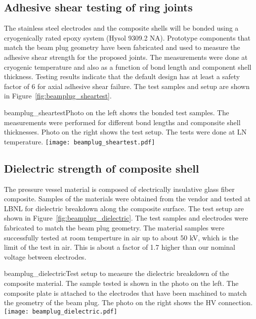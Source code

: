 \subsection{Adhesive shear testing of ring joints}
The stainless steel electrodes and the composite shells will be bonded using a cryogenically rated epoxy system (Hysol 9309.2 NA). Prototype components that match the beam plug geometry have been fabricated and used to measure the adhesive shear strength for the proposed joints. The measurements were done at cryogenic temperature and also as a function of bond length and component shell thickness. Testing results indicate that the default design has at least a safety factor of 6 for axial adhesive shear failure. The test samples and setup are shown in Figure~\ref{fig:beamplug_sheartest}.

\begin{cdrfigure}{beamplug_sheartest}{Photo on the left shows the bonded test samples. The measurements were performed for different bond lengths and componsite shell thicknesses. Photo on the right shows the test setup. The tests were done at LN temperature.}
  \texttt{[image: beamplug\_sheartest.pdf]}
\end{cdrfigure}

\subsection{Dielectric strength of composite shell}
The pressure vessel material is composed of electrically insulative glass fiber composite. Samples of the materials were obtained from the vendor and tested at LBNL for dielectric breakdown along the composite surface. The test setup are shown in Figure~\ref{fig:beamplug_dielectric}. The test samples and electrodes were fabricated to match the beam plug geometry. The material samples were successfully tested at room temperture in air up to about 50 kV, which is the limit of the test in air. This is about a factor of 1.7 higher than our nominal voltage between electrodes.

\begin{cdrfigure}{beamplug_dielectric}{Test setup to measure the dielectric breakdown of the composite material. The sample tested is shown in the photo on the left. The composite plate is attached to the electrodes that have been machined to match the geometry of the beam plug. The photo on the right shows the HV connection.}
  \texttt{[image: beamplug\_dielectric.pdf]}
\end{cdrfigure}

